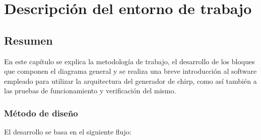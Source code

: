 \chapter{Descripción del entorno de trabajo}
\section{Resumen}

En este capítulo se explica la metodología de trabajo, el desarrollo de los bloques que componen el diagrama general y se realiza una breve introducción al software empleado para utilizar la arquitectura del generador de chirp, como así también a las pruebas de funcionamiento y verificación del mismo.

\subsection{Método de diseño}

El desarrollo se basa en el siguiente flujo:

